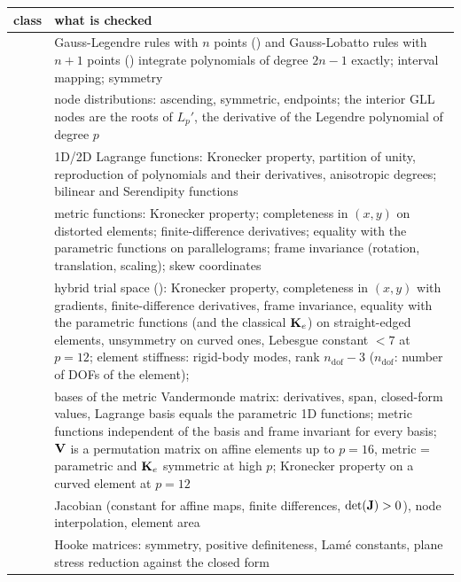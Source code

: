 \begin{xltabular}{\linewidth}{@{}P{5.0cm}L@{}}
  \toprule
  class & what is checked \\
  \midrule
  \endhead
   & Gauss-Legendre rules with $n$ points ()
    and Gauss-Lobatto rules with $n+1$ points () integrate
    polynomials of degree $2n-1$ exactly; interval mapping; symmetry \\
   & node distributions: ascending, symmetric,
    endpoints; the interior GLL nodes are the roots of $L_p'$, the derivative of
    the Legendre polynomial of degree $p$ \\
   & 1D/2D Lagrange functions: Kronecker property,
    partition of unity, reproduction of polynomials and their derivatives,
    anisotropic degrees; bilinear and Serendipity functions \\
   & metric functions: Kronecker property;
    completeness in $(x,y)$ on distorted elements; finite-difference
    derivatives; equality with the parametric functions on parallelograms; frame
    invariance (rotation, translation, scaling); skew coordinates \\
   & hybrid trial space (): Kronecker
    property, completeness in $(x,y)$ with gradients, finite-difference
    derivatives, frame invariance, equality with the parametric functions (and the
    classical $\mathbf{K}_e$) on straight-edged elements, unsymmetry on curved ones,
    Lebesgue constant $<7$ at $p=12$; element stiffness: rigid-body modes, rank
    $n_\mathrm{dof}-3$ ($n_\mathrm{dof}$: number of DOFs of the element);
     \\
   & bases of the metric Vandermonde matrix: derivatives,
    span, closed-form values, Lagrange basis equals the parametric 1D functions;
    metric functions independent of the basis and frame invariant for every basis;
    $\mathbf{V}$ is a permutation matrix on affine elements up to $p=16$, metric =
    parametric and $\mathbf{K}_e$ symmetric at high $p$; Kronecker property on a
    curved element at $p=12$ \\
   & Jacobian (constant for affine maps, finite
    differences, $\det(\mathbf{J})>0$), node interpolation, element area \\
   & Hooke matrices: symmetry, positive definiteness, Lamé
    constants, plane stress reduction against the closed form \\

\end{xltabular}
